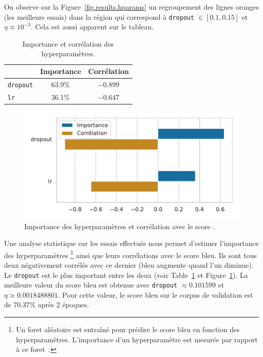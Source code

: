 On observe sur la Figure~\ref{fig.results.hparams} un regroupement des lignes oranges (les meilleurs essais) 
dans la région qui correspond à \verb|dropout| \(\in[0.1, 0.15]\) et \(\eta\approx 10 ^{-3}\).
Cela est aussi apparent sur le tableau.
\begin{table}[hbt]
    \begin{center}
        \begin{tabular}{|l|c|c|}
            \cline{2-3}
            \multicolumn{1}{c|}{} & Importance & Corrélation \\
            \hline
            \verb|dropout|        & 63.9\%     & \(- 0.899\)     \\
            \hline
            \verb|lr|             & 36.1\%     & \(- 0.647\)     \\
            \hline
        \end{tabular}
    \end{center}
    \caption{Importance et corrélation des hyperparamètres.}
    \label{tab.results.hparam.corr}
\end{table}
\begin{figure}[hbt]
    \begin{center}
        \includegraphics[width=.7\textwidth]{assets/python/importance.pdf}
    \end{center}
    \caption{Importance des hyperparamètres et corrélation avec le score .}%
    \label{fig.results.hparam.corr}
\end{figure}
Une analyse statistique sur les essais effectués nous permet d'estimer l'importance des hyperparamètres%
\footnote{Un foret aléatoire est entraîné pour prédire le score \gls{bleu} en fonction des hyperparamètres. 
L'importance d'un hyperparamètre est mesurée par rapport à ce foret~\cite{wandb_parameter_importance}.}
ainsi que leurs corrélations avec le score \gls{bleu}.
Ils sont tous deux négativement corrélés avec ce dernier (\gls{bleu} augmente quand l'un diminue).
Le \verb|dropout| est le plus important entre les deux 
(voir Table~\ref{tab.results.hparam.corr} et Figure~\ref{fig.results.hparam.corr}).
La meilleure valeur du score \gls{bleu} est obtenue 
avec \verb|dropout| \(\approx 0.101599\) et \(\eta\approx 0.0018488801\).
Pour cette valeur, le score \gls{bleu} sur le corpus de validation est de 70.37\% après 2 époques.